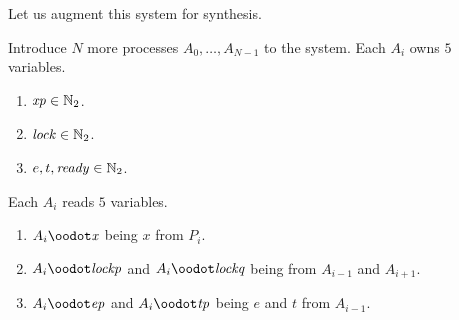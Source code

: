 Let us augment this system for synthesis.

Introduce $N$ more processes $A_0,\dots,A_{N-1}$ to the system.
Each $A_i$ owns $5$ variables.
\begin{enumerate}
\item $\mathit{xp} \in \mathbb{N}_2$.
\item $\mathit{lock} \in \mathbb{N}_2$.
\item $e,t,\mathit{ready} \in \mathbb{N}_2$.
\end{enumerate}
Each $A_i$ reads $5$ variables.
\begin{enumerate}
\item $A_i\oodot\vbl{x}$ being $x$ from $P_i$.
\item $A_i\oodot\vbl{lockp}$ and $A_i\oodot\vbl{lockq}$ being  from $A_{i-1}$ and $A_{i+1}$.
\item $A_i\oodot\vbl{ep}$ and $A_i\oodot\vbl{tp}$ being $e$ and $t$ from $A_{i-1}$.
\end{enumerate}

